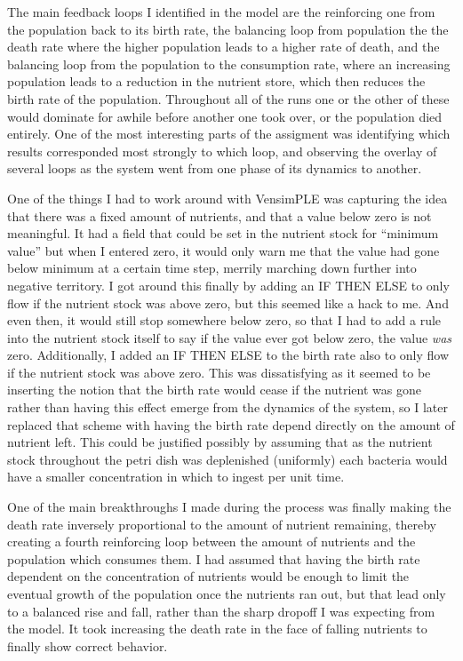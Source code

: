 \documentclass[12pt]{article}
\begin{document}
The main feedback loops I identified in the model are the reinforcing one from the population back to its birth rate, the balancing loop from population the the death rate where the higher population leads to a higher rate of death, and the balancing loop from the population to the consumption rate, where an increasing population leads to a reduction in the nutrient store, which then reduces the birth rate of the population.  Throughout all of the runs one or the other of these would dominate for awhile before another one took over, or the population died entirely.  One of the most interesting parts of the assigment was identifying which results corresponded most strongly to which loop, and observing the overlay of several loops as the system went from one phase of its dynamics to another.  

One of the things I had to work around with VensimPLE was capturing the idea that there was a fixed amount of nutrients, and that a value below zero is not meaningful.  It had a field that could be set in the nutrient stock for ``minimum value'' but when I entered zero, it would only warn me that the value had gone below minimum at a certain time step, merrily marching down further into negative territory.  I got around this finally by adding an IF THEN ELSE to only flow if the nutrient stock was above zero, but this seemed like a hack to me.  And even then, it would still stop somewhere below zero, so that I had to add a rule into the nutrient stock itself to say if the value ever got below zero, the value {\em was} zero.  Additionally, I added an IF THEN ELSE to the birth rate also to only flow if the nutrient stock was above zero.  This was dissatisfying as it seemed to be inserting the notion that the birth rate would cease if the nutrient was gone rather than having this effect emerge from the dynamics of the system, so I later replaced that scheme with having the birth rate depend directly on the amount of nutrient left.  This could be justified possibly by assuming that as the nutrient stock throughout the petri dish was deplenished (uniformly) each bacteria would have a smaller concentration in which to ingest per unit time.  

One of the main breakthroughs I made during the process was finally making the death rate inversely proportional to the amount of nutrient remaining, thereby creating a fourth reinforcing loop between the amount of nutrients and the population which consumes them.  I had assumed that having the birth rate dependent on the concentration of nutrients would be enough to limit the eventual growth of the population once the nutrients ran out, but that lead only to a balanced rise and fall, rather than the sharp dropoff I was expecting from the model.  It took increasing the death rate in the face of falling nutrients to finally show correct behavior.  
\end{document}
